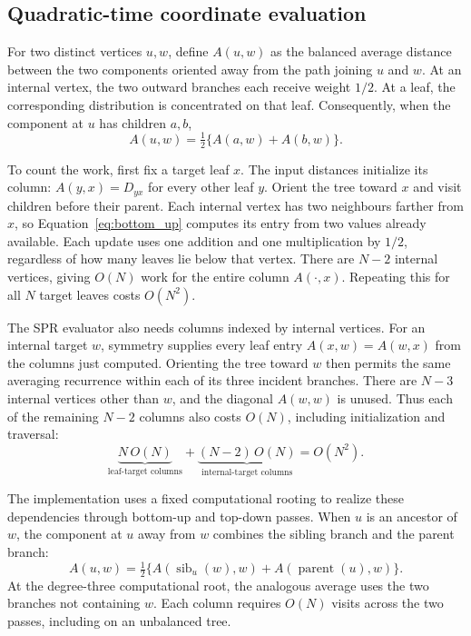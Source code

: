 \subsection{Quadratic-time coordinate evaluation}

For two distinct vertices $u,w$, define $A(u,w)$ as the balanced average distance between the two components oriented away from the path joining $u$ and $w$.
At an internal vertex, the two outward branches each receive weight $1/2$.
At a leaf, the corresponding distribution is concentrated on that leaf.
Consequently, when the component at $u$ has children $a,b$,
\begin{equation}
 A(u,w)=\tfrac12\{A(a,w)+A(b,w)\}.
 \label{eq:bottom_up}
\end{equation}

To count the work, first fix a target leaf $x$.
The input distances initialize its column: $A(y,x)=D_{yx}$ for every other leaf $y$.
Orient the tree toward $x$ and visit children before their parent.
Each internal vertex has two neighbours farther from $x$, so Equation~\eqref{eq:bottom_up} computes its entry from two values already available.
Each update uses one addition and one multiplication by $1/2$, regardless of how many leaves lie below that vertex.
There are $N-2$ internal vertices, giving $O(N)$ work for the entire column $A(\cdot,x)$.
Repeating this for all $N$ target leaves costs $O(N^2)$.

The SPR evaluator also needs columns indexed by internal vertices.
For an internal target $w$, symmetry supplies every leaf entry $A(x,w)=A(w,x)$ from the columns just computed.
Orienting the tree toward $w$ then permits the same averaging recurrence within each of its three incident branches.
There are $N-3$ internal vertices other than $w$, and the diagonal $A(w,w)$ is unused.
Thus each of the remaining $N-2$ columns also costs $O(N)$, including initialization and traversal:
\[
 \underbrace{N\,O(N)}_{\text{leaf-target columns}}
 +\underbrace{(N-2)\,O(N)}_{\text{internal-target columns}}
 =O(N^2).
\]

The implementation uses a fixed computational rooting to realize these dependencies through bottom-up and top-down passes.
When $u$ is an ancestor of $w$, the component at $u$ away from $w$ combines the sibling branch and the parent branch:
\begin{equation}
 A(u,w)=\tfrac12\{A(\operatorname{sib}_u(w),w)
                         +A(\operatorname{parent}(u),w)\}.
 \label{eq:top_down}
\end{equation}
At the degree-three computational root, the analogous average uses the two branches not containing $w$.
Each column requires $O(N)$ visits across the two passes, including on an unbalanced tree.

